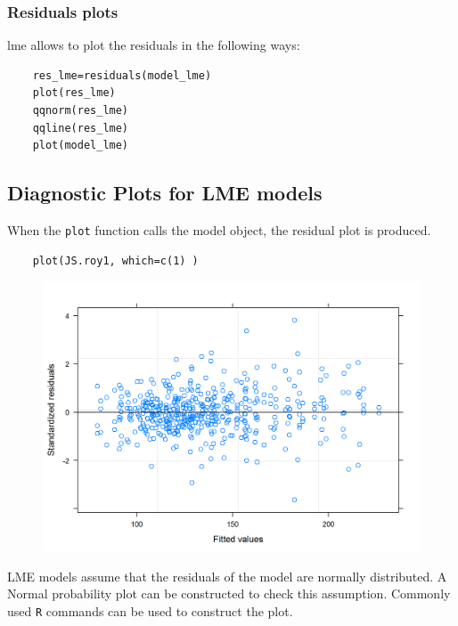 
\subsubsection{Residuals plots}

lme allows to plot the residuals in the following ways:

\begin{framed}
	\begin{verbatim}
	res_lme=residuals(model_lme)
	plot(res_lme)
	qqnorm(res_lme)
	qqline(res_lme)
	plot(model_lme)
	\end{verbatim}
\end{framed}



\subsection{Diagnostic Plots for LME models}



When the \texttt{plot} function calls the model object, the residual plot is produced.





\begin{framed}
	\begin{verbatim}
	plot(JS.roy1, which=c(1) )
	\end{verbatim}
\end{framed}


\begin{figure}[h!]
	\centering
	\includegraphics[width=0.9\linewidth]{images/ResidPlot1}
	\caption{}
	\label{fig:ResidPlot1}
\end{figure}
LME models assume that the residuals of the model are normally distributed. A Normal probability plot can be constructed to check this assumption. Commonly used \texttt{R} commands can be used to construct the plot.
\newpage

